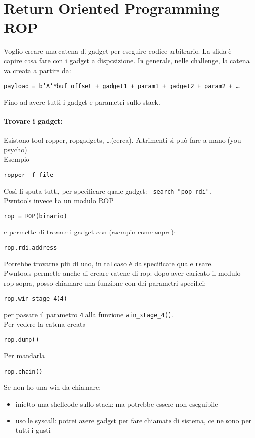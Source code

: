 \section{Return Oriented Programming ROP}

Voglio creare una catena di gadget per eseguire codice arbitrario. La sfida è capire cosa fare con i gadget a disposizione. In generale, nelle challenge, la catena va creata a partire da: 
\begin{center}
	\texttt{payload = b'A'*buf\_offset + gadget1 + param1 + gadget2 + param2 + \dots}
\end{center}
Fino ad avere tutti i gadget e parametri sullo stack.\\

\paragraph{Trovare i gadget:} Esistono tool ropper, ropgadgets, \dots (cerca). Altrimenti si può fare a mano (you psycho).\\
Esempio 
\begin{center}
	\texttt{ropper -f file}
\end{center}
Così li sputa tutti, per specificare quale gadget: \texttt{--search "pop rdi"}.\\

Pwntools invece ha un modulo ROP
\begin{center}
	\texttt{rop = ROP(binario)}
\end{center}
e permette di trovare i gadget con (esempio come sopra):
\begin{center}
	\texttt{rop.rdi.address}
\end{center}
Potrebbe trovarne più di uno, in tal caso è da specificare quale usare.\\

Pwntools permette anche di creare catene di rop: dopo aver caricato il modulo rop sopra, posso chiamare una funzione con dei parametri specifici:
\begin{center}
	\texttt{rop.win\_stage\_4(4)}
\end{center}
per passare il parametro \texttt{4} alla funzione \texttt{win\_stage\_4()}.\\

Per vedere la catena creata
\begin{center}
	\texttt{rop.dump()}
\end{center}
Per mandarla 
\begin{center}
	\texttt{rop.chain()}
\end{center}

Se non ho una win da chiamare:
\begin{itemize}
	\item inietto una shellcode sullo stack: ma potrebbe essere non eseguibile
	\item uso le syscall: potrei avere gadget per fare chiamate di sistema, ce ne sono per tutti i gusti
\end{itemize}